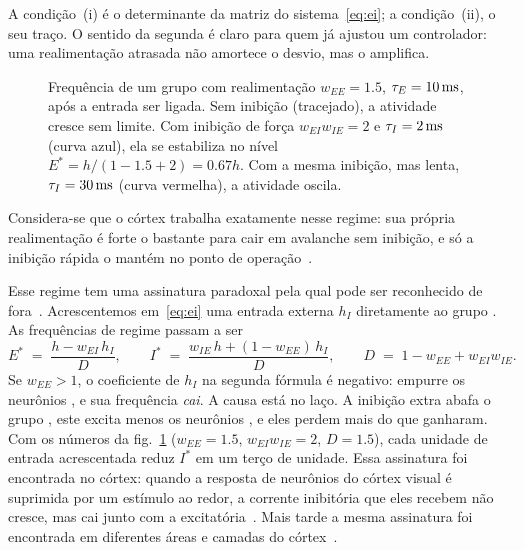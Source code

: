 A condição~(i) é o determinante da matriz do sistema~\eqref{eq:ei}; a condição~(ii), o seu traço. O sentido da segunda é claro para quem já ajustou um controlador: uma realimentação atrasada não amortece o desvio, mas o amplifica.

\begin{figure}[t]
\centering
{}
\caption{Frequência de um grupo  com realimentação $w_{EE}=1.5$, $\tau_E=10\,\text{ms}$, após a entrada ser ligada. Sem inibição (tracejado), a atividade cresce sem limite. Com inibição de força $w_{EI}w_{IE}=2$ e $\tau_I=2\,\text{ms}$ (curva azul), ela se estabiliza no nível $E^*=h/(1-1.5+2)=0.67h$. Com a mesma inibição, mas lenta, $\tau_I=30\,\text{ms}$ (curva vermelha), a atividade oscila.}
\label{fig:ei}
\end{figure}

Considera-se que o córtex trabalha exatamente nesse regime: sua própria realimentação é forte o bastante para cair em avalanche sem inibição, e só a inibição rápida o mantém no ponto de operação~\cite{Tsodyks1997isn}.

Esse regime tem uma assinatura paradoxal pela qual pode ser reconhecido de fora~\cite{Tsodyks1997isn}. Acrescentemos em~\eqref{eq:ei} uma entrada externa $h_I$ diretamente ao grupo . As frequências de regime passam a ser
\begin{equation}
E^* \;=\; \frac{h-w_{EI}\,h_I}{D},\qquad
I^* \;=\; \frac{w_{IE}\,h+(1-w_{EE})\,h_I}{D},\qquad
D \;=\; 1-w_{EE}+w_{EI}w_{IE} .
\label{eq:isn}
\end{equation}
Se $w_{EE}>1$, o coeficiente de $h_I$ na segunda fórmula é negativo: empurre os neurônios , e sua frequência \emph{cai}. A causa está no laço. A inibição extra abafa o grupo , este excita menos os neurônios , e eles perdem mais do que ganharam. Com os números da fig.~\ref{fig:ei} ($w_{EE}=1.5$, $w_{EI}w_{IE}=2$, $D=1.5$), cada unidade de entrada acrescentada reduz $I^*$ em um terço de unidade. Essa assinatura foi encontrada no córtex: quando a resposta de neurônios do córtex visual é suprimida por um estímulo ao redor, a corrente inibitória que eles recebem não cresce, mas cai junto com a excitatória~\cite{Ozeki2009}. Mais tarde a mesma assinatura foi encontrada em diferentes áreas e camadas do córtex~\cite{Sanzeni2020}.

